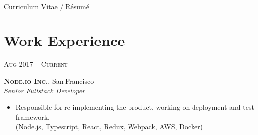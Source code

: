 \documentclass[10pt]{article}
\begin{document}
\color{text1} %


\par{\\[8pt] %
{\color{headings} Curriculum {Vitae / Résumé}\\[15pt]\par} %
	

\begin{minipage}[t]{0.5\textwidth} %
\vspace{0pt} %
	

\section{Work Experience} 

{\raggedleft\textsc{Aug 2017 -- Current}\par}

{\raggedright\large \textbf{\textsc{Node.io Inc.}}, San Francisco\\
\textit{Senior Fullstack Developer}\\[5pt]}

\begin{itemize}
	\item Responsible for re-implementing the product, working on deployment and test framework. \\
	{\color{Mahogany}(Node.js, Typescript, React, Redux, Webpack, AWS, Docker)}
\end{itemize}



\end{minipage}}
\end{document}
